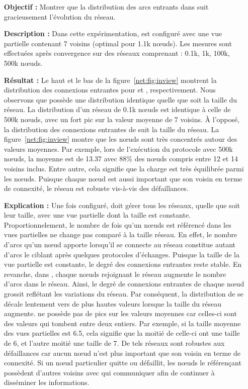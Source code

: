 \begin{itemize}
\item [\textbf{Objectif :}] Montrer que la distribution des arcs entrants dans
  \SPRAY suit gracieusement l'évolution du réseau.
\item [\textbf{Description :}] Dans cette expérimentation, \CYCLON est configuré
  avec une vue partielle contenant 7 voisins (optimal pour 1.1k nœuds). Les
  mesures sont effectuées après convergence sur des réseaux comprenant : 0.1k,
  1k, 100k, 500k nœuds.
\item [\textbf{Résultat :}] Le haut et le bas de la figure~\ref{net:fig:inview}
  montrent la distribution des connexions entrantes pour \CYCLON et \SPRAY,
  respectivement. Nous observons que \CYCLON possède une distribution identique
  quelle que soit la taille du réseau. La distribution d'un réseau de 0.1k nœuds
  est identique à celle de 500k nœuds, avec un fort pic sur la valeur moyenne de
  7 voisins. À l'opposé, la distribution des connexions entrantes de \SPRAY suit
  la taille du réseau. La figure~\ref{net:fig:inview} montre que les nœuds sont
  très concentrés autour des valeurs moyennes. Par exemple, lors de l'exécution
  du protocole \SPRAY avec 500k nœuds, la moyenne est de 13.37 avec 88\% des
  nœuds compris entre 12 et 14 voisins inclus. Entre autre, cela signifie que la
  charge est très équilibrée parmi les nœuds. Puisque chaque nœud est aussi
  important que son voisin en terme de connexité, le réseau est robuste
  vis-à-vis des défaillances.
\item [\textbf{Explication :}] Une fois configuré, \CYCLON doit gérer tous les
  réseaux, quelle que soit leur taille, avec une vue partielle dont la taille
  est constante. Proportionnelement, le nombre de fois qu'un nœuds est référencé
  dans les vues partielles ne change pas comparé à la taille réseau. En effet,
  le nombre d'arcs qu'un nœud apporte lorsqu'il se connecte au réseau constitue
  autant d'arcs le ciblant après quelques protocoles d'échanges. Puisque la
  taille de la vue partielle est constante, le degré des connexions entrantes
  reste stable. En revanche, dans \SPRAY, chaque nœuds rejoignant le réseau
  augmente le nombre d'arcs dans le réseau. Ainsi, le degré de connexions
  entrantes de chaque nœud grossit reflétant les variations du réseau. Par
  conséquent, la distribution de \SPRAY se décale lentement vers de plus hautes
  valeurs lorsque la taille du réseau augmente. \SPRAY ne possède pas de pics
  sur les valeurs moyennes car celles-ci sont des valeurs qui tombent entre deux
  entiers. Par exemple, si la taille moyenne des vues partielles est 6.5, cela
  signifie que la moitié de celle-ci ont une taille de 6, et l'autre moitié une
  taille de 7. De tels réseaux sont robustes aux défaillances car aucun nœud
  n'est plus important que son voisin en terme de connexité. Si un nœud
  particulier quitte ou défaillit, les nœuds le référençant possèdent d'autres
  voisins avec qui communiquer afin de continuer à disséminer les informations.
\end{itemize}

